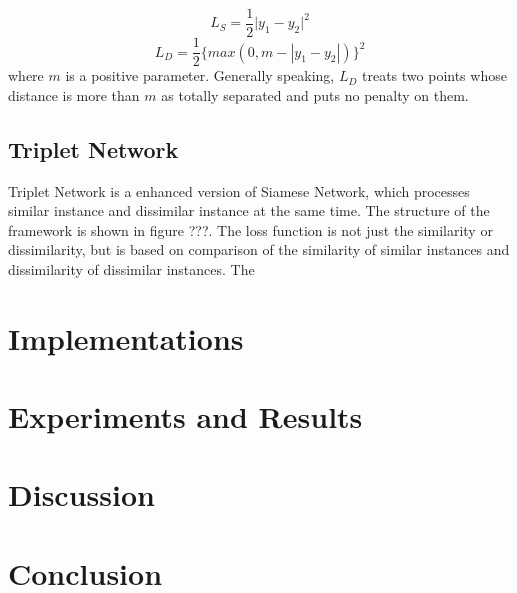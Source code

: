 \documentclass[10pt,twocolumn,letterpaper]{article}
\begin{document}
			\begin{equation}
				L_S = \frac{1}{2}\lvert y_1 - y_2 \rvert^2
			\end{equation}
			\begin{equation}
				L_D = \frac{1}{2}\{max(0, m-|y_1-y_2|)\}^2
			\end{equation}
			where $m$ is a positive parameter. Generally speaking, $L_D$ treats two points whose distance is more than $m$ as totally separated and puts no penalty on them.
		
		\subsection{Triplet Network}
			Triplet Network is a enhanced version of Siamese Network, which processes similar instance and dissimilar instance at the same time. The structure of the framework is shown in figure ???. The loss function is not just the similarity or dissimilarity, but is based on comparison of the similarity of similar instances and dissimilarity of dissimilar instances. The 
	\section{Implementations \label{sec:Impl}}
	
	
	\section{Experiments and Results \label{sec:Res}}
	
	
	\section{Discussion \label{sec:Disc}}
	
	
	\section{Conclusion \label{sec:Conc}}
	
	{\small
		
		
	}
	
\end{document}
